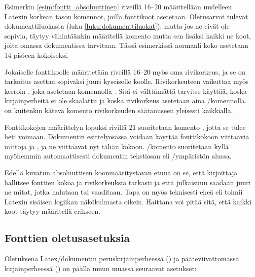 \begin{koodilohkosis}
  \sffamilyabs\fontsize{16bp}{18bp}\bfseries
\end{koodilohkosis}

Esimerkin \ref{esim:fontti_absoluuttinen} riveillä 16--20 määritellään
uudelleen Latexin korkean tason komennot, joilla fonttikoot asetetaan.
Oletus\-arvot tulevat dokumenttiluokasta (luku
\ref{luku:dokumenttiluokat}), mutta jos ne eivät ole sopivia, täytyy
vähintäänkin määritellä komento  mutta sen
lisäksi kaikki ne koot, joita omassa dokumentissa tarvitaan. Tässä
esimerkissä normaali koko asetetaan 14 pisteen kokoiseksi.

Jokaiselle fonttikoolle määritetään riveillä 16--20 myös oma
rivikorkeus, ja se on tarkoitus asettaa sopivaksi juuri kyseiselle
koolle. Rivikorkeuteen vaikuttaa myös kerroin , joka asetetaan komennolla .
Sitä ei välttämättä tarvitse käyttää, koska kirjainperheitä ei ole
skaalattu ja koska rivikorkeus asetetaan aina \-/komennolla.  on kuitenkin kätevä
komento rivikorkeuden säätämiseen yleisesti kaikkialla.

Fonttikokojen määrittelyn lopuksi rivillä 21 suoritetaan komento
, jotta se tulee heti voimaan. Dokumentin
esittelyosassa voidaan käyttää fonttikokoon viittaavia mittoja
 ja , ja ne viittaavat nyt tähän kokoon.
\-/komento suoritetaan kyllä myöhemmin
automaattisesti dokumentin tekstiosan eli \-/ympäristön
alussa.

Edellä kuvatun absoluuttisen koonmääritystavan etuna on se, että
kirjoittaja hallitsee fonttien kokoa ja rivikorkeuksia tarkasti ja että
julkaisuun saadaan juuri ne mitat, jotka halutaan tai vaaditaan. Tapa on
myös teknisesti eheä eli toimii Latexin sisäisen logiikan näkökulmasta
oikein. Haittana voi pitää sitä, että kaikki koot täytyy määritellä
erikseen.

\subsection{Fonttien oletus\-asetuksia}

Oletuksena%
 
Latex\-/dokumentin peruskirjainperheessä ()
ja pääteviivattomassa kirjainperheessä ()
on päällä muun muassa seuraavat asetukset:%

